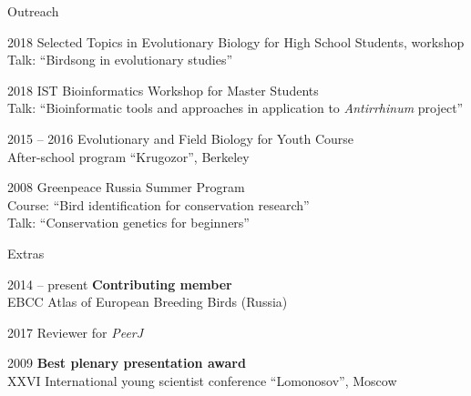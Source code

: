 \documentclass[10pt]{article}
\begin{document}
\begin{cv}
\begin{cvlist}{Outreach}
\item[2018] Selected Topics in Evolutionary Biology for High School Students, workshop\\
Talk: ``Birdsong in evolutionary studies''
\item[2018] IST Bioinformatics Workshop for Master Students\\
Talk: ``Bioinformatic tools and approaches in application to \textit{Antirrhinum} project''
\item[2015 -- 2016 ] Evolutionary and Field Biology for Youth Course\\
After-school program ``Krugozor'', Berkeley
\item[2008] Greenpeace Russia Summer Program\\
Course: ``Bird identification for conservation research''\\
Talk: ``Conservation genetics for beginners''
\end{cvlist}




\begin{cvlist}{Extras}
     \item [2014 -- present] \textbf{Contributing member}\\
     EBCC Atlas of European Breeding Birds (Russia)
	
\item [2017] Reviewer for \textit{PeerJ}
\item[2009] \textbf{Best plenary presentation award}\\
XXVI International  young scientist conference ``Lomonosov'', Moscow
\end{cvlist}






\end{cv}
\end{document}
